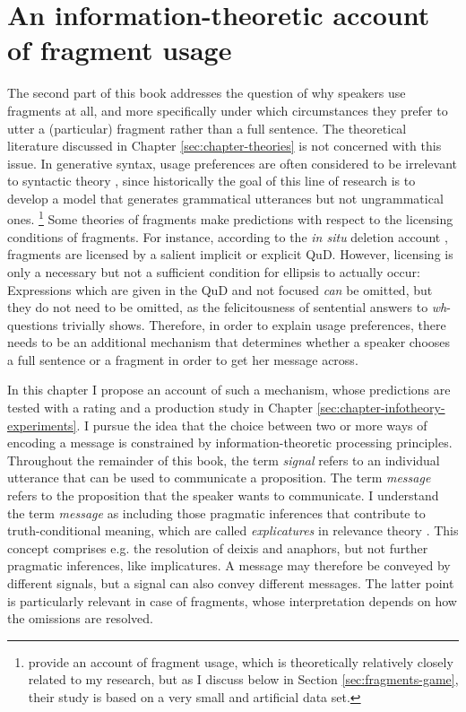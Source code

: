 \chapter{An information-theoretic account of fragment usage}
\label{sec:chapter-infotheory}

The second part of this book addresses the question of why speakers use fragments at all, and more specifically under which circumstances they prefer to utter a (particular) fragment rather than a full sentence. The theoretical literature discussed in Chapter \ref{sec:chapter-theories} is not concerned with this issue. In generative syntax, usage preferences are often considered to be irrelevant to syntactic theory \citep[see e.g.][]{newmeyer2003}, since historically the goal of this line of research is to develop a model that generates grammatical utterances but not ungrammatical ones.%
%
\footnote{\citet{bergen.goodman2015} provide an account of fragment usage, which is theoretically relatively closely related to my research, but as I discuss below in Section \ref{sec:fragments-game}, their study is based on a very small and artificial data set.}\afterfn%
%
Some theories of fragments make predictions with respect to the licensing conditions of fragments. For instance, according to the \textit{in situ} deletion account \citep{reich2007}, fragments are licensed by a salient implicit or explicit QuD. However, licensing is only a necessary but not a sufficient condition for ellipsis to actually occur: Expressions which are given in the QuD and not focused \textit{can} be omitted, but they do not need to be omitted, as the felicitousness of sentential answers to \textit{wh}-questions trivially shows. Therefore, in order to explain usage preferences, there needs to be an additional mechanism that determines whether a speaker chooses a full sentence or a fragment in order to get her message across. 

In this chapter I propose an account of such a mechanism, whose predictions are tested with a rating and a production study in Chapter \ref{sec:chapter-infotheory-experiments}. I pursue the idea that the choice between two or more ways of encoding a message is constrained by information-theoretic \citep{shannon1948} processing principles. Throughout the remainder of this book, the term \textit{signal} refers to an individual utterance that can be used to communicate a proposition. The term \textit{message} refers to the proposition that the speaker wants to communicate. I understand the term \textit{message} as including those pragmatic inferences that contribute to truth-conditional meaning, which are called \textit{explicatures} in relevance theory \citep{sperber.wilson1995}. This concept comprises e.g. the resolution of deixis and anaphors, but not further pragmatic inferences, like implicatures. A message may therefore be conveyed by different signals, but a signal can also convey different messages. The latter point is particularly relevant in case of fragments, whose interpretation depends on how the omissions are resolved.


